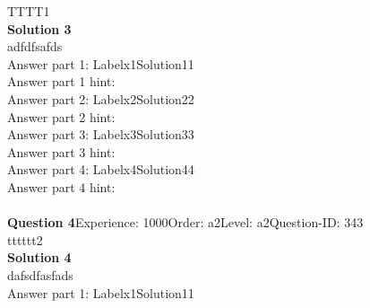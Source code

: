 \documentclass{article}
\begin{document}
TTTT1\\[4pt]
\noindent\textbf{Solution 3}\\[2pt]
adfdfsafds\\[4pt]
Answer part 1: \hspace{10pt}Label\hspace{10pt}x1\hspace{10pt}Solution\hspace{10pt}11\\
Answer part 1 hint: \hspace{15pt}\\
Answer part 2: \hspace{10pt}Label\hspace{10pt}x2\hspace{10pt}Solution\hspace{10pt}22\\
Answer part 2 hint: \hspace{15pt}\\
Answer part 3: \hspace{10pt}Label\hspace{10pt}x3\hspace{10pt}Solution\hspace{10pt}33\\
Answer part 3 hint: \hspace{15pt}\\
Answer part 4: \hspace{10pt}Label\hspace{10pt}x4\hspace{10pt}Solution\hspace{10pt}44\\
Answer part 4 hint: \hspace{15pt}\\
\\[4pt]
\noindent\textbf{Question 4}\hspace{20pt}Experience: 1000\hspace{20pt}Order: a2\hspace{20pt}Level: a2\hspace{20pt}Question-ID: 343\\[2pt]
tttttt2\\[4pt]
\noindent\textbf{Solution 4}\\[2pt]
dafsdfasfads\\[4pt]
Answer part 1: \hspace{10pt}Label\hspace{10pt}x1\hspace{10pt}Solution\hspace{10pt}11\\
\end{document}
